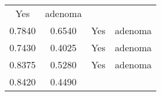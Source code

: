 \documentclass[12pt,]{article}
\begin{document}
\begin{longtable}[]{@{}cccc@{}}
\begin{minipage}[t]{0.22\columnwidth}
Yes\strut
\end{minipage} & \begin{minipage}[t]{0.16\columnwidth}\centering\strut
adenoma\strut
\end{minipage}\tabularnewline
\begin{minipage}[t]{0.24\columnwidth}\centering\strut
0.7840\strut
\end{minipage} & \begin{minipage}[t]{0.26\columnwidth}\centering\strut
0.6540\strut
\end{minipage} & \begin{minipage}[t]{0.22\columnwidth}\centering\strut
Yes\strut
\end{minipage} & \begin{minipage}[t]{0.16\columnwidth}\centering\strut
adenoma\strut
\end{minipage}\tabularnewline
\begin{minipage}[t]{0.24\columnwidth}\centering\strut
0.7430\strut
\end{minipage} & \begin{minipage}[t]{0.26\columnwidth}\centering\strut
0.4025\strut
\end{minipage} & \begin{minipage}[t]{0.22\columnwidth}\centering\strut
Yes\strut
\end{minipage} & \begin{minipage}[t]{0.16\columnwidth}\centering\strut
adenoma\strut
\end{minipage}\tabularnewline
\begin{minipage}[t]{0.24\columnwidth}\centering\strut
0.8375\strut
\end{minipage} & \begin{minipage}[t]{0.26\columnwidth}\centering\strut
0.5280\strut
\end{minipage} & \begin{minipage}[t]{0.22\columnwidth}\centering\strut
Yes\strut
\end{minipage} & \begin{minipage}[t]{0.16\columnwidth}\centering\strut
adenoma\strut
\end{minipage}\tabularnewline
\begin{minipage}[t]{0.24\columnwidth}\centering\strut
0.8420\strut
\end{minipage} & \begin{minipage}[t]{0.26\columnwidth}\centering\strut
0.4490\strut
\end{minipage} & \begin{minipage}[t]{0.22\columnwidth}\centering\strut

\end{minipage}
\end{longtable}
\end{document}
